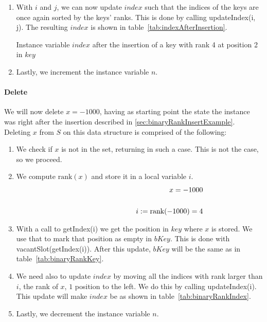 \begin{enumerate}
    \item
    With $i$ and $j$, we can now update $index$ such that the indices of the keys are once again sorted by the keys' ranks. This is done by calling {\ttfamily updateIndex(i, j)}. The resulting $index$ is shown in table~\ref{tab:indexAfterInsertion}.
    \begin{table}[H]
    \centering
    
    \caption[Example $index$ after the insertion of a new key]{Instance variable $index$ after the insertion of a key with rank 4 at position 2 in $key$}
    \label{tab:indexAfterInsertion}
    \end{table}
    
    \item
    Lastly, we increment the instance variable $n$.
\end{enumerate}

\paragraph{Delete}

We will now delete $x = -1000$, having as starting point the state the instance was right after the insertion described in \ref{sec:binaryRankInsertExample}. Deleting $x$ from $S$ on this data structure is comprised of the following:
\begin{enumerate}
    \item
    We check if $x$ is not in the set, returning in such a case.
    This is not the case, so we proceed.
    
    \item
    We compute $\text{rank}(x)$ and store it in a local variable $i$.
    \begin{align*}
        x = -1000 \\
        \cline{1-2}
        i := \text{rank}(-1000) = 4
    \end{align*}
    
    \item
    With a call to {\ttfamily getIndex(i)} we get the position in $key$ where $x$ is stored. We use that to mark that position as empty in $bKey$. This is done with {\ttfamily vacantSlot(getIndex(i))}. After this update, $bKey$ will be the same as in table~\ref{tab:binaryRankKey}.
    
    \item
    We need also to update $index$ by moving all the indices with rank larger than $i$, the rank of $x$, $1$ position to the left. We do this by calling {\ttfamily updateIndex(i)}. This update will make $index$ be as shown in table~\ref{tab:binaryRankIndex}.
    
    \item
    Lastly, we decrement the instance variable $n$.
\end{enumerate}

